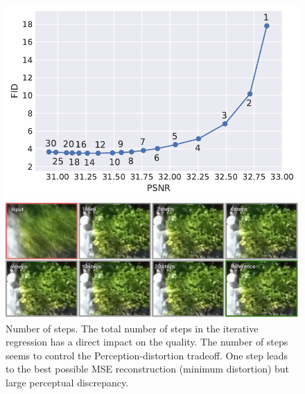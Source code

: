 \begin{figure}[ht]
    \centering
    \begin{minipage}[c]{.35\linewidth}
    \includegraphics[width=\linewidth]{assets/pd_curve_gopro.pdf}
    \end{minipage}
    \begin{minipage}{.63\linewidth}
    \includegraphics[width=\linewidth]{assets/IIR-gopro-motion-deblurring-steps.pdf}
    \end{minipage}
    \caption{Number of steps. The total number of steps in the iterative regression has a direct impact on the quality. The number of steps seems to control the Perception-distortion tradeoff. One step leads to the best possible MSE reconstruction (minimum distortion) but large perceptual discrepancy.}
    \label{fig:gopro_steps}

\end{figure}
